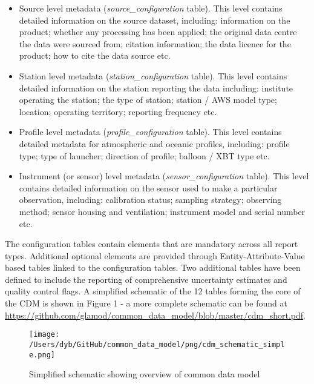 \documentclass[a4paper,11pt]{article}
\begin{document}
\begin{itemize}
\item Source level metadata (\textit{source\_configuration} table). This level contains detailed information on the source dataset, including: information on the product; whether any processing has been applied; the original data centre the data were sourced from; citation information; the data licence for the product; how to cite the data source etc.
\item Station level metadata (\textit{station\_configuration} table). This level contains detailed information on the station reporting the data including: institute operating the station; the type of station; station / AWS model type; location; operating territory; reporting frequency etc.
\item Profile level metadata (\textit{profile\_configuration} table). This level contains detailed metadata for atmospheric and oceanic profiles, including: profile type; type of launcher; direction of profile; balloon / XBT type etc.
\item Instrument (or sensor) level metadata (\textit{sensor\_configuration} table). This level contains detailed information on the sensor used to make a particular observation, including: calibration status; sampling strategy; observing method; sensor housing and ventilation; instrument model and serial number etc.
\end{itemize}

The configuration tables contain elements that are mandatory across all report types. Additional optional elements are provided through Entity-Attribute-Value based tables linked to the configuration tables. Two additional tables have been defined to include the reporting of comprehensive uncertainty estimates and quality control flags. A simplified schematic of the 12 tables forming the core of the CDM is shown in Figure 1 - a more complete schematic can be found at \url{https://github.com/glamod/common_data_model/blob/master/cdm_short.pdf}. \\

\begin{figure}
\centering
\texttt{[image: /Users/dyb/GitHub/common\_data\_model/png/cdm\_schematic\_simple.png]}
\caption {Simplified schematic showing overview of common data model}
\end{figure}
\FloatBarrier
\end{document}
